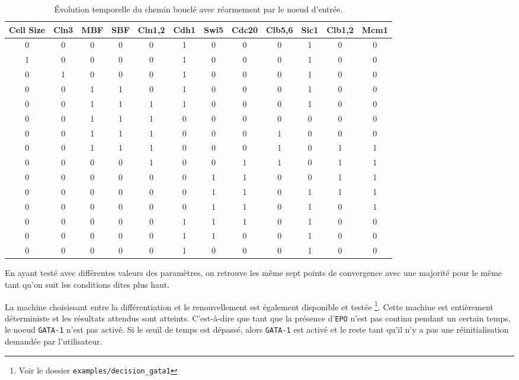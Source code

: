 \documentclass[11pt, a4paper]{article}
\begin{document}
\begin{center}
    \begin{table}
        \caption{
            \label{cycle_path}
            Évolution temporelle du chemin bouclé avec réarmement par le noeud
            d'entrée.
        }
        \small
        \begin{tabular}{c c c c c c c c c c c c}
            Cell Size & Cln3 & MBF & SBF & Cln1,2 & Cdh1 & Swi5 & Cdc20 &
            Clb5,6 & Sic1 & Clb1,2 & Mcm1 \\
            \hline
            0 & 0 & 0 & 0 & 0 & 1 & 0 & 0 & 0 & 1 & 0 & 0 \\
            1 & 0 & 0 & 0 & 0 & 1 & 0 & 0 & 0 & 1 & 0 & 0 \\
            0 & 1 & 0 & 0 & 0 & 1 & 0 & 0 & 0 & 1 & 0 & 0 \\
            0 & 0 & 1 & 1 & 0 & 1 & 0 & 0 & 0 & 1 & 0 & 0 \\
            0 & 0 & 1 & 1 & 1 & 1 & 0 & 0 & 0 & 1 & 0 & 0 \\
            0 & 0 & 1 & 1 & 1 & 0 & 0 & 0 & 0 & 0 & 0 & 0 \\
            0 & 0 & 1 & 1 & 1 & 0 & 0 & 0 & 1 & 0 & 0 & 0 \\
            0 & 0 & 1 & 1 & 1 & 0 & 0 & 0 & 1 & 0 & 1 & 1 \\
            0 & 0 & 0 & 0 & 1 & 0 & 0 & 1 & 1 & 0 & 1 & 1 \\
            0 & 0 & 0 & 0 & 0 & 0 & 1 & 1 & 0 & 0 & 1 & 1 \\
            0 & 0 & 0 & 0 & 0 & 0 & 1 & 1 & 0 & 1 & 1 & 1 \\
            0 & 0 & 0 & 0 & 0 & 0 & 1 & 1 & 0 & 1 & 0 & 1 \\
            0 & 0 & 0 & 0 & 0 & 1 & 1 & 1 & 0 & 1 & 0 & 0 \\
            0 & 0 & 0 & 0 & 0 & 1 & 1 & 0 & 0 & 1 & 0 & 0 \\
            0 & 0 & 0 & 0 & 0 & 1 & 0 & 0 & 0 & 1 & 0 & 0 \\
        \end{tabular}
        \normalsize
    \end{table}
\end{center}

En ayant testé avec différentes valeurs des paramètres, on retrouve les même
sept points de convergence avec une majorité pour le même tant qu'on suit les
conditions dites plus haut.

La machine choisissant entre la différentiation et le renouvellement est
également disponible et testée \footnote{Voir le dossier
\texttt{examples/decision\_gata1}}. Cette machine est entièrement déterministe
et les résultats attendus sont atteints. C'est-à-dire que tant que la présence
d'\texttt{EPO} n'est pas continu pendant un certain temps, le noeud
\texttt{GATA-1} n'est pas activé. Si le seuil de temps est dépassé, alors
\texttt{GATA-1} est activé et le reste tant qu'il n'y a pas une
réinitialisation demandée par l'utilisateur.
\end{document}
